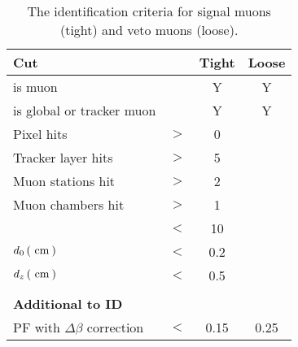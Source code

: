 \begin{table}[h!]
    \centering
    \caption{The identification criteria for signal muons (tight) and veto muons (loose).}
    \label{tb:muID}
    \begin{tabular}{lccc}
            \textbf{Cut}      			&		&  \textbf{Tight}    & \textbf{Loose}  \\
            \hline
            is \PF{} muon 				&		&	Y				 &	Y \\			
            is global or tracker muon 	&		&	Y				 &	Y \\	
            Pixel hits 					&	$>$	&	0				 &	\NA{} \\	
            Tracker layer hits 			&	$>$	&	5				 &	\NA{} \\	
            Muon stations hit           &   $>$ &   2                &  \NA{} \\    
            Muon chambers hit           &   $>$ &   1                &  \NA{} \\    
            \chisndf{}                  &   $<$ &   10               &  \NA{} \\
            $d_0\,(\mathrm{~cm}^{}\,)$ 					&	$<$	&	0.2		 &	\NA{} \\
            $d_z\,(\mathrm{~cm}^{}\,)$ 					&	$<$	&	0.5		 &	\NA{} \\
            \\
            \textbf{Additional to ID} & & & \\   
            \hline
            PF \Irel{} with $\Delta\beta$ correction   & $ < $ & 0.15  & 0.25  \\
    \end{tabular} \\
\end{table}


